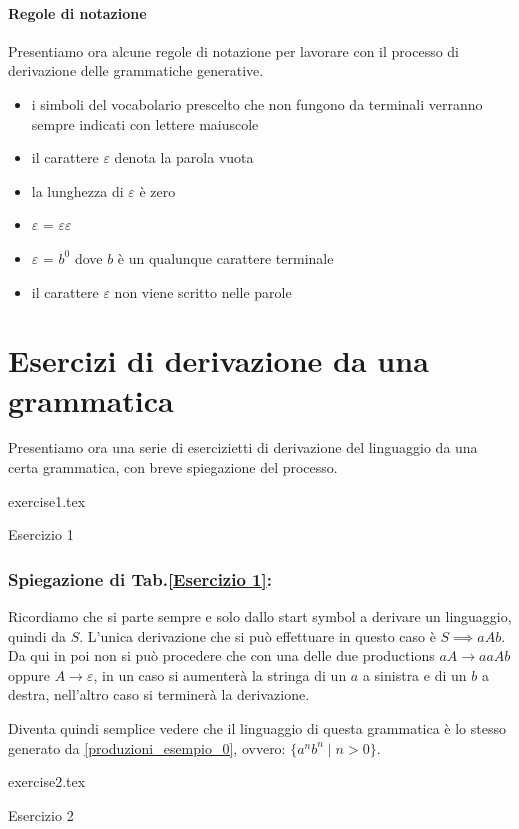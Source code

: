 \documentclass[class=book, crop=false, oneside, 12pt]{standalone}
\begin{document}
\paragraph{Regole di notazione}
Presentiamo ora alcune regole di notazione per lavorare con il processo di derivazione delle grammatiche generative.
\begin{itemize}
    \item i simboli del vocabolario prescelto che non fungono da terminali verranno sempre indicati con lettere maiuscole
    \item il carattere \(\varepsilon\) denota la parola vuota
    \item la lunghezza di \(\varepsilon\) è zero
    \item \(\varepsilon\) = \(\varepsilon\)\(\varepsilon\)
    \item \(\varepsilon\) =  \(b^0\) dove \(b\) è un qualunque carattere terminale
    \item il carattere \(\varepsilon\) non viene scritto nelle parole
\end{itemize}

\section{Esercizi di derivazione da una grammatica}
Presentiamo ora una serie di esercizietti di derivazione del linguaggio da una certa grammatica, con breve spiegazione del processo.
\begin{table}[H]
	\centering
	{exercise1.tex}
    \caption{Esercizio 1}
    \label{Esercizio 1}
\end{table}
\subsubsection*{Spiegazione di Tab.\ref{Esercizio 1}:}
Ricordiamo che si parte sempre e solo dallo start symbol a derivare un linguaggio, quindi da \(S\). L'unica derivazione che si può effettuare in questo caso è \(S \implies aAb\). Da qui in poi non si può procedere che con una delle due productions \(aA \to aaAb\) oppure \(A \to \varepsilon\), in un caso si aumenterà la stringa di un \(a\) a sinistra e di un \(b\) a destra, nell'altro caso si terminerà la derivazione.

Diventa quindi semplice vedere che il linguaggio di questa grammatica è lo stesso generato da \ref{produzioni_esempio_0}, ovvero: \(\{a^n b^n \mid n>0\}\).
\begin{table}[H]
	\centering
	{exercise2.tex}
    \caption{Esercizio 2}
    \label{Esercizio 2}
\end{table}
\end{document}
